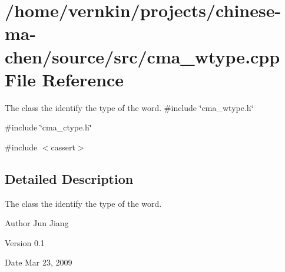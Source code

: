 \section{/home/vernkin/projects/chinese-\/ma-\/chen/source/src/cma\_\-wtype.cpp File Reference}
\label{cma__wtype_8cpp}


The class the identify the type of the word.  
{\ttfamily \#include \char`\"{}cma\_\-wtype.h\char`\"{}}\par
{\ttfamily \#include \char`\"{}cma\_\-ctype.h\char`\"{}}\par
{\ttfamily \#include $<$cassert$>$}\par


\subsection{Detailed Description}
The class the identify the type of the word. \begin{DoxyAuthor}{Author}
Jun Jiang 
\end{DoxyAuthor}
\begin{DoxyVersion}{Version}
0.1 
\end{DoxyVersion}
\begin{DoxyDate}{Date}
Mar 23, 2009 
\end{DoxyDate}
